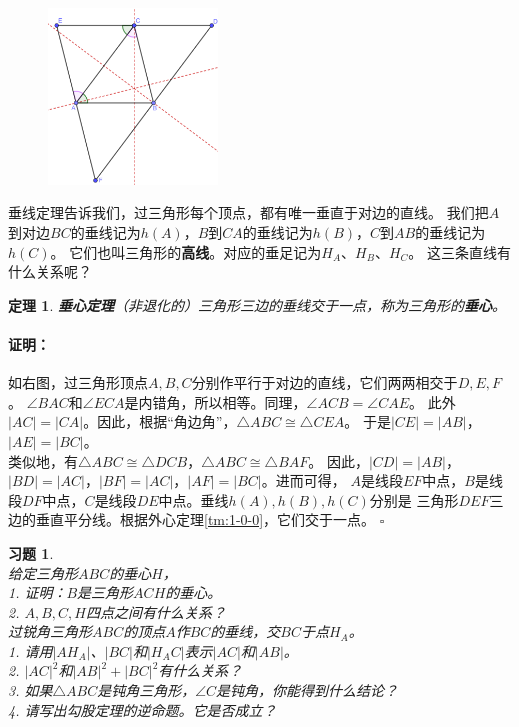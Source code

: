 \documentclass[12pt,UTF8]{ctexbook}
\newtheorem{tm}{定理}[section]
\newenvironment{proof2}{\paragraph{\textbf{证明：}}}{\hfill$\square$}
\newtheorem{xt}{习题}[section]
\begin{document}
\begin{figure} %
    \vspace{-45pt}
    \flushright
    \includegraphics[width=0.4\textwidth]{三角形7.png}
\end{figure}

垂线定理告诉我们，过三角形每个顶点，都有唯一垂直于对边的直线。
我们把$A$到对边$BC$的垂线记为$h(A)$，$B$到$CA$的垂线记为$h(B)$，$C$到$AB$的垂线记为$h(C)$。
它们也叫三角形的\textbf{高线}。对应的垂足记为$H_A$、$H_B$、$H_C$。
这三条直线有什么关系呢？

\begin{tm}{\textbf{垂心定理}}\label{tm:1-1-0}
    （非退化的）三角形三边的垂线交于一点，称为三角形的\textbf{垂心}。
\end{tm}

\begin{proof2}
    如右图，过三角形顶点$A,B,C$分别作平行于对边的直线，它们两两相交于$D,E,F$。
    $\angle BAC$和$\angle ECA$是内错角，所以相等。同理，$\angle ACB = \angle CAE$。
    此外$|AC| = |CA|$。因此，根据“角边角”，$\triangle ABC \cong \triangle CEA$。
    于是$|CE| = |AB|$，$|AE| = |BC|$。\\
    类似地，有$\triangle ABC \cong \triangle DCB$，$\triangle ABC \cong \triangle BAF$。
    因此，$|CD| = |AB|$，$|BD| = |AC|$，$|BF| = |AC|$，$|AF| = |BC|$。进而可得，
    $A$是线段$EF$中点，$B$是线段$DF$中点，$C$是线段$DE$中点。垂线$h(A), h(B), h(C)$分别是
    三角形$DEF$三边的垂直平分线。根据外心定理\ref{tm:1-0-0}，它们交于一点。
\end{proof2}
\begin{xt}\label{xt:1-1-0}
    \mbox{}\\
    给定三角形$ABC$的垂心$H$，\\
    1. 证明：$B$是三角形$ACH$的垂心。\\
    2. $A,B,C,H$四点之间有什么关系？\\
    过锐角三角形$ABC$的顶点$A$作$BC$的垂线，交$BC$于点$H_A$。\\
    1. 请用$|AH_A|$、$|BC|$和$|H_AC|$表示$|AC|$和$|AB|$。\\
    2. $|AC|^2$和$|AB|^2 + |BC|^2$有什么关系？\\
    3. 如果$\triangle ABC$是钝角三角形，$\angle C$是钝角，你能得到什么结论？\\
    4. 请写出勾股定理的逆命题。它是否成立？
\end{xt}
\end{document}
